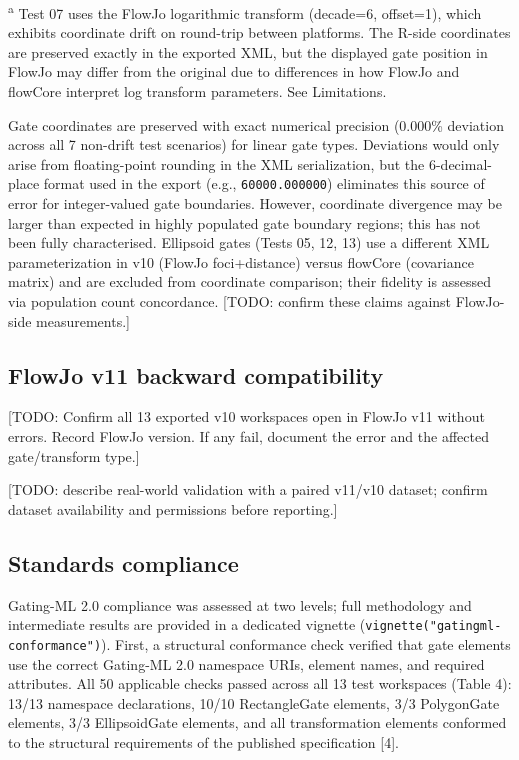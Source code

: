 \documentclass[
]{article}
\begin{document}
\textsuperscript{a} Test 07 uses the FlowJo logarithmic transform
(decade=6, offset=1), which exhibits coordinate drift on round-trip
between platforms. The R-side coordinates are preserved exactly in the
exported XML, but the displayed gate position in FlowJo may differ from
the original due to differences in how FlowJo and flowCore interpret log
transform parameters. See Limitations.

\textcolor{pending}{Gate coordinates are preserved with exact numerical precision (0.000\% deviation across all 7 non-drift test scenarios) for linear gate types. Deviations would only arise from floating-point rounding in the XML serialization, but the 6-decimal-place format used in the export (e.g., \texttt{60000.000000}) eliminates this source of error for integer-valued gate boundaries. However, coordinate divergence may be larger than expected in highly populated gate boundary regions; this has not been fully characterised. Ellipsoid gates (Tests 05, 12, 13) use a different XML parameterization in v10 (FlowJo foci+distance) versus flowCore (covariance matrix) and are excluded from coordinate comparison; their fidelity is assessed via population count concordance. [TODO: confirm these claims against FlowJo-side measurements.]}

\subsection{FlowJo v11 backward
compatibility}\label{flowjo-v11-backward-compatibility}

\textcolor{pending}{[TODO: Confirm all 13 exported v10 workspaces open in FlowJo v11 without errors. Record FlowJo version. If any fail, document the error and the affected gate/transform type.]}

\textcolor{pending}{[TODO: describe real-world validation with a paired v11/v10 dataset; confirm dataset availability and permissions before reporting.]}

\subsection{Standards compliance}\label{standards-compliance}

Gating-ML 2.0 compliance was assessed at two levels; full methodology
and intermediate results are provided in a dedicated vignette
(\texttt{vignette("gatingml-conformance")}). First, a structural
conformance check verified that gate elements use the correct Gating-ML
2.0 namespace URIs, element names, and required attributes. All 50
applicable checks passed across all 13 test workspaces (Table 4): 13/13
namespace declarations, 10/10 RectangleGate elements, 3/3 PolygonGate
elements, 3/3 EllipsoidGate elements, and all transformation elements
conformed to the structural requirements of the published specification
{[}4{]}.
\end{document}
